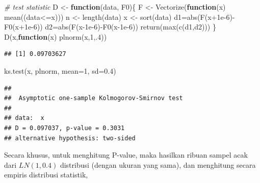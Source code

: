 \documentclass[
]{book}
\newenvironment{Shaded}{\begin{snugshade}}{\end{snugshade}}
\newcommand{\AttributeTok}[1]{\textcolor[rgb]{0.77,0.63,0.00}{#1}}
\newcommand{\CommentTok}[1]{\textcolor[rgb]{0.56,0.35,0.01}{\textit{#1}}}
\newcommand{\ControlFlowTok}[1]{\textcolor[rgb]{0.13,0.29,0.53}{\textbf{#1}}}
\newcommand{\DecValTok}[1]{\textcolor[rgb]{0.00,0.00,0.81}{#1}}
\newcommand{\FloatTok}[1]{\textcolor[rgb]{0.00,0.00,0.81}{#1}}
\newcommand{\FunctionTok}[1]{\textcolor[rgb]{0.00,0.00,0.00}{#1}}
\newcommand{\NormalTok}[1]{#1}
\newcommand{\OtherTok}[1]{\textcolor[rgb]{0.56,0.35,0.01}{#1}}
\newcommand{\SpecialCharTok}[1]{\textcolor[rgb]{0.00,0.00,0.00}{#1}}
\begin{document}
\begin{Shaded}
\begin{Highlighting}[]
\CommentTok{\# test statistic}
\NormalTok{D }\OtherTok{\textless{}{-}} \ControlFlowTok{function}\NormalTok{(data, F0)\{}
\NormalTok{   F }\OtherTok{\textless{}{-}} \FunctionTok{Vectorize}\NormalTok{(}\ControlFlowTok{function}\NormalTok{(x) }\FunctionTok{mean}\NormalTok{((data}\SpecialCharTok{\textless{}=}\NormalTok{x)))}
\NormalTok{   n }\OtherTok{\textless{}{-}} \FunctionTok{length}\NormalTok{(data)}
\NormalTok{   x }\OtherTok{\textless{}{-}} \FunctionTok{sort}\NormalTok{(data)}
\NormalTok{   d1}\OtherTok{=}\FunctionTok{abs}\NormalTok{(}\FunctionTok{F}\NormalTok{(x}\FloatTok{+1e{-}6}\NormalTok{)}\SpecialCharTok{{-}}\FunctionTok{F0}\NormalTok{(x}\FloatTok{+1e{-}6}\NormalTok{))}
\NormalTok{   d2}\OtherTok{=}\FunctionTok{abs}\NormalTok{(}\FunctionTok{F}\NormalTok{(x}\FloatTok{{-}1e{-}6}\NormalTok{)}\SpecialCharTok{{-}}\FunctionTok{F0}\NormalTok{(x}\FloatTok{{-}1e{-}6}\NormalTok{))}
   \FunctionTok{return}\NormalTok{(}\FunctionTok{max}\NormalTok{(}\FunctionTok{c}\NormalTok{(d1,d2)))}
\NormalTok{\}}
\FunctionTok{D}\NormalTok{(x,}\ControlFlowTok{function}\NormalTok{(x) }\FunctionTok{plnorm}\NormalTok{(x,}\DecValTok{1}\NormalTok{,.}\DecValTok{4}\NormalTok{))}
\end{Highlighting}
\end{Shaded}

\begin{verbatim}
## [1] 0.09703627
\end{verbatim}

\begin{Shaded}
\begin{Highlighting}[]
\FunctionTok{ks.test}\NormalTok{(x, plnorm, }\AttributeTok{mean=}\DecValTok{1}\NormalTok{, }\AttributeTok{sd=}\FloatTok{0.4}\NormalTok{)}
\end{Highlighting}
\end{Shaded}

\begin{verbatim}
## 
##  Asymptotic one-sample Kolmogorov-Smirnov test
## 
## data:  x
## D = 0.097037, p-value = 0.3031
## alternative hypothesis: two-sided
\end{verbatim}

Secara khusus, untuk menghitung P-value, maka hasilkan ribuan sampel acak dari \(LN(1,0.4)\) distribusi (dengan ukuran yang sama), dan menghitung secara empiris distribusi statistik,
\end{document}
